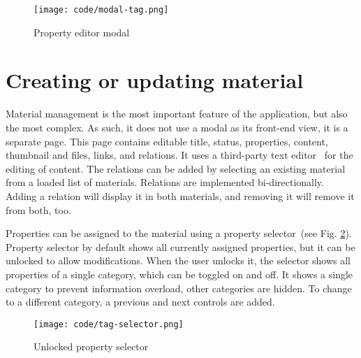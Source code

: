 \documentclass[
  digital,     %
  oneside,     %
  nosansbold,  %
  colorbold, %
  lof,         %
  lot,         %
]{fithesis4}
\newcommand{\imgref}[1]{(see Fig. \ref{fig:#1})}
\begin{document}
\begin{figure}[!htbp]
	\begin{center}
		\begin{minipage}{.4\textwidth}
			\texttt{[image: code/modal-tag.png]}
		\end{minipage}
	\end{center}
	\caption{Property editor modal}
	\label{fig:modal-tag}
\end{figure}

\section{Creating or updating material}
\label{sect:material-editor}

Material management is the most important feature of the application, but also the most complex. As
such, it does not use a modal as its front-end view, it is a separate page. This page contains editable
title, status, properties, content, thumbnail and files, links, and relations. It uses a third-party text
editor~\cite{tinymce} for the editing of content. The relations can be added by selecting an existing
material from a loaded list of materials. Relations are implemented bi-directionally. Adding a relation
will display it in both materials, and removing it will remove it from both, too.

Properties can be assigned to the material using a property selector~\imgref{tag-selector}. Property
selector by default shows all currently assigned properties, but it can be unlocked to allow
modifications. When the user unlocks it, the selector shows all properties of a single category, which
can be toggled on and off. It shows a single category to prevent information overload, other
categories are hidden. To change to a different category, a previous and next controls are added.

\begin{figure}[!htbp]
	\begin{center}
		\begin{minipage}{.6\textwidth}
			\texttt{[image: code/tag-selector.png]}
		\end{minipage}
	\end{center}
	\caption{Unlocked property selector}
	\label{fig:tag-selector}
\end{figure}
\end{document}
